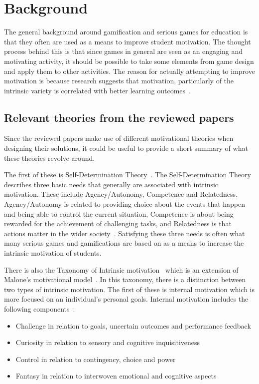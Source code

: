 \section{Background}
The general background around gamification and serious games for education is that they often are used as a means to improve student motivation. The thought process behind this is that since games in general are seen as an engaging and motivating activity, it should be possible to take some elements from game design and apply them to other activities. The reason for actually attempting to improve motivation is because research suggests that motivation, particularly of the intrinsic variety is correlated with better learning outcomes~\cite{ryan2000intrinsic}.

\subsection{Relevant theories from the reviewed papers}
Since the reviewed papers make use of different motivational theories when designing their solutions, it could be useful to provide a short summary of what these theories revolve around.  

The first of these is Self-Determination Theory~\cite{ryan2000intrinsic}. The Self-Determination Theory describes three basic needs that generally are associated with intrinsic motivation. These include Agency/Autonomy, Competence and Relatedness. Agency/Autonomy is related to providing choice about the events that happen and being able to control the current situation, Competence is about being rewarded for the achievement of challenging tasks, and Relatedness is that actions matter in the wider society~\cite{simonSDTshort}. Satisfying these three needs is often what many serious games and gamifications are based on as a means to increase the intrinsic motivation of students. 
    
There is also the Taxonomy of Intrinsic motivation~\cite{maloneTax} which is an extension of Malone's motivational model~\cite{malone1981toward}. In this taxonomy, there is a distinction between two types of intrinsic motivation. The first of these is internal motivation which is more focused on an individual's personal goals. Internal motivation includes the following components~\cite{maloneTax, mozelius2014game}:

\begin{itemize}
    \item Challenge in relation to goals, uncertain outcomes and performance feedback
    \item Curiosity in relation to sensory and cognitive inquisitiveness
    \item Control in relation to contingency, choice and power
    \item Fantasy in relation to interwoven emotional and cognitive aspects
\end{itemize}

